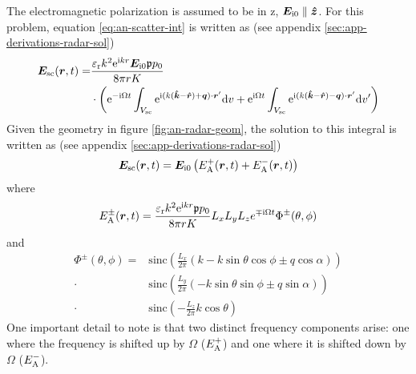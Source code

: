 \documentclass[11pt,twoside]{eitExjobb}
\begin{document}
	The electromagnetic polarization is assumed to be in z, $\bm{E}_{\mathrm{i}0} \parallel \bm{\hat{z}}$. For this problem, equation \eqref{eq:an-scatter-int} is written as (see appendix \ref{sec:app-derivations-radar-sol})
	\begin{equation*}
	\begin{split}
		\bm{E}_{\mathrm{sc}}(\bm{r},t) =& \frac{\varepsilon_{\mathrm{r}}k^2 \mathrm{e}^{\mathrm{i} kr} \bm{E}_{\mathrm{i}0} \mathfrak{p} p_0}{8\pi r K} \\
		&\cdot \left( \mathrm{e}^{-\mathrm{i} \Omega t} \int_{V_{\mathrm{sc}}} \mathrm{e}^{\mathrm{i} ( k(\bm{\hat{k}} - \bm{\hat{r}}) + \bm{q} ) \cdot \bm{r}'} \mathrm{d}v + \mathrm{e}^{\mathrm{i} \Omega t} \int_{V_{\mathrm{sc}}} \mathrm{e}^{\mathrm{i} ( k(\bm{\hat{k}} - \bm{\hat{r}}) - \bm{q} ) \cdot \bm{r}'} \mathrm{d}v' \right)
	\end{split}
	\end{equation*}
	Given the geometry in figure \ref{fig:an-radar-geom}, the solution to this integral is written as (see appendix \ref{sec:app-derivations-radar-sol})
	\begin{equation*}
		\bm{E}_{\mathrm{sc}} (\bm{r},t) = \bm{E}_{\mathrm{i}0} \left( E_{\mathrm{A}}^+ (\bm{r},t) + E_{\mathrm{A}}^- (\bm{r},t) \right)
	\end{equation*}
	where
	\begin{equation*}
		E_{\mathrm{A}}^\pm (\bm{r},t) = \frac{\varepsilon_{\mathrm{r}}k^2 \mathrm{e}^{\mathrm{i} kr} \mathfrak{p} p_0}{8\pi r K} L_{x} L_{y} L_{z} e^{\mp \mathrm{i} \Omega t} \Phi^\pm (\theta,\phi)
	\end{equation*}
	and
	\begin{equation*}
	\begin{split}
		\Phi^\pm(\theta,\phi) =& \text{sinc} \left( \frac{L_{x}}{2\pi} \left( k - k\sin{\theta}\cos{\phi} \pm q\cos{\alpha} \right) \right) \\
		\cdot& \text{sinc} \left( \frac{L_{y}}{2\pi} \left( -k\sin{\theta}\sin{\phi} \pm q\sin{\alpha} \right) \right) \\
		\cdot& \text{sinc} \left( -\frac{L_{z}}{2\pi} k\cos{\theta} \right)
	\end{split}
	\end{equation*}
	One important detail to note is that two distinct frequency components arise: one where the frequency is shifted up by $\Omega$ ($E_{\mathrm{A}}^+$) and one where it is shifted down by $\Omega$ ($E_{\mathrm{A}}^-$).
	
\end{document}

